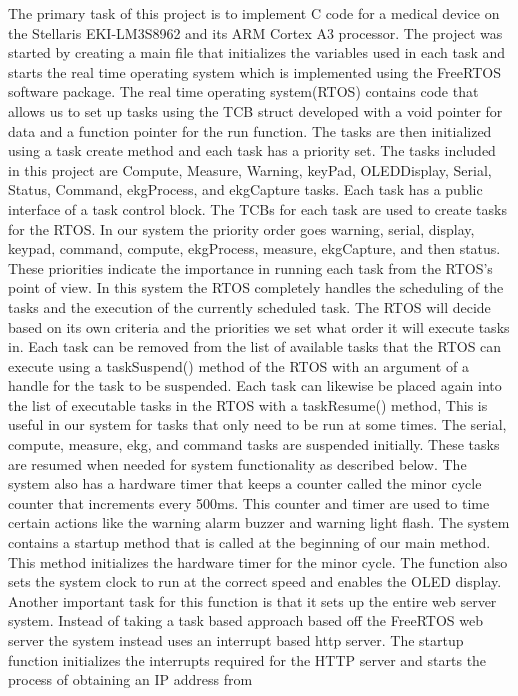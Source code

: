 \documentclass[12pt]{article} %
\begin{document}
    The primary task of this project is to implement C code for a medical
    device on the Stellaris EKI-LM3S8962 and its ARM Cortex A3 processor. The
    project was started by creating a main file that initializes the variables
    used in each task and starts the real time operating system which is implemented using the FreeRTOS software package. 
The real time operating system(RTOS) contains code that allows us to set up tasks using the TCB struct developed with a void pointer for data and a function pointer for the run function.
The tasks are then initialized using a task create method and each task has a priority set. The tasks
    included in this project are Compute, Measure, Warning, keyPad,
    OLEDDisplay, Serial, Status, Command, ekgProcess, and ekgCapture tasks. Each task has a public interface of a task control block. The TCBs for each task are used to create tasks for
the RTOS. In our system the priority order goes warning, serial, display, keypad, command, compute, ekgProcess, measure, ekgCapture, and then status. These priorities indicate the importance in running each task from the RTOS's point of view.
In this system the RTOS completely handles the scheduling of the tasks and the execution of the currently scheduled task. The RTOS will decide based on its own criteria and the priorities we set what order it will 
execute tasks in. Each task can be removed from the list of available tasks that the RTOS can execute using a taskSuspend() method of the RTOS with an argument of a handle for the task to be suspended.
Each task can likewise be placed again into the list of executable tasks in the RTOS with a taskResume() method, This is useful in our system for tasks that only need to be run at some times. 
The serial, compute, measure, ekg, and command tasks are suspended initially. These tasks are resumed when needed for system functionality as described below. 
The system also has a hardware timer that keeps a counter called the minor cycle counter that increments every 500ms. This counter and timer
are used to time certain actions like the warning alarm buzzer and warning light flash.
The system contains a startup method that is called at the beginning of our main method. 
This method initializes the hardware timer for the minor cycle. The function also sets the system clock to run at the correct speed and enables the OLED display.
Another important task for this function is that it sets up the entire web server system. Instead of taking a task based approach based off the FreeRTOS web server the system instead
uses an interrupt based http server. The startup function initializes the interrupts required for the HTTP server and starts the process of obtaining an IP address from
\end{document}
